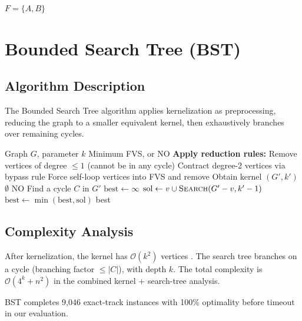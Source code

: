 \documentclass[10pt,a4paper]{report}
\theoremstyle{definition}
\newcommand{\bigO}[1]{\mathcal{O}\!\left(#1\right)}
\begin{document}
\textbf{$F=\{A,B\}$}




\section{Bounded Search Tree (BST)}

\subsection{Algorithm Description}

The Bounded Search Tree algorithm applies kernelization as preprocessing, reducing the graph to a smaller equivalent kernel, then exhaustively branches over remaining cycles.

\begin{algorithm}[H]
	\caption{Kernelization + Bounded Search Tree}
	\label{alg:bst}
	\begin{algorithmic}[1]
		\Require Graph $G$, parameter $k$
		\Ensure Minimum FVS, or NO
		\State \textbf{Apply reduction rules:}
		\Statex \hspace*{1em}Remove vertices of degree $\leq 1$ (cannot be in any cycle)
		\Statex \hspace*{1em}Contract degree-2 vertices via bypass rule
		\Statex \hspace*{1em}Force self-loop vertices into FVS and remove
		\State Obtain kernel $(G', k')$
		 \Return $\emptyset$ \EndIf
		 \Return NO \EndIf
		\State Find a cycle $C$ in $G'$
		\State $\text{best} \leftarrow \infty$
		\State $\text{sol} \leftarrow v \cup \textsc{Search}(G' - v, k' - 1)$
		\State $\text{best} \leftarrow \min(\text{best}, \text{sol})$
		\EndFor
		\Return best
		\EndFunction
	\end{algorithmic}
\end{algorithm}

\subsection{Complexity Analysis}

After kernelization, the kernel has $\bigO{k^2}$ vertices \cite{thomasse2010}. The search tree branches on a cycle (branching factor $\leq |C|$), with depth $k$. The total complexity is $\bigO{4^k + n^2}$ in the combined kernel + search-tree analysis.

BST completes 9,046 exact-track instances with 100\% optimality before timeout in our evaluation.
\end{document}
